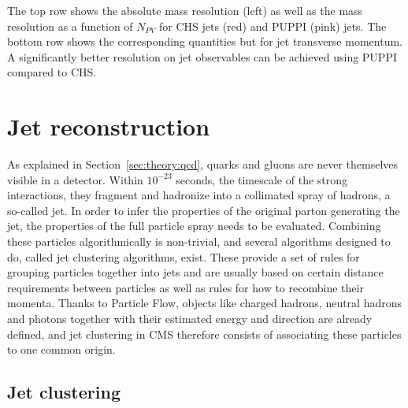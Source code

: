 The top row shows the absolute mass resolution (left) as well as the mass resolution as a function of $N_{PV}$ for CHS jets (red) and PUPPI (pink) jets. The bottom row shows the corresponding quantities but for jet transverse momentum. A significantly better resolution on jet observables can be achieved using PUPPI compared to CHS.



\section{Jet reconstruction}
\label{sec:objreco:jets}
As explained in Section~\ref{sec:theory:qcd}, quarks and gluons are never themselves visible in a detector. Within $10^{-23}$ seconds, the timescale of the strong interactions, they fragment and hadronize into a collimated spray of hadrons, a so-called jet. In order to infer the properties of the original parton generating the jet, the properties of the full particle spray needs to be evaluated.
Combining these particles algorithmically is non-trivial, and several algorithms designed to do, called jet clustering algorithms, exist.
These provide a set of rules for grouping particles together into jets and are usually based on certain distance requirements between particles as well as rules for how to recombine their momenta.
Thanks to Particle Flow, objects like charged hadrons, neutral hadrons and photons together with their estimated energy and direction are already defined, and jet clustering in CMS therefore consists of
associating these particles to one common origin.


\subsection{Jet clustering}

